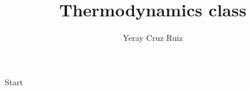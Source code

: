 \documentclass{lgacfancy}
\title{Thermodynamics class}
\author[1]{Yeray Cruz Ruiz}
\affil[1]{A01746286}
\begin{document}
\maketitle

Start
\end{document}
